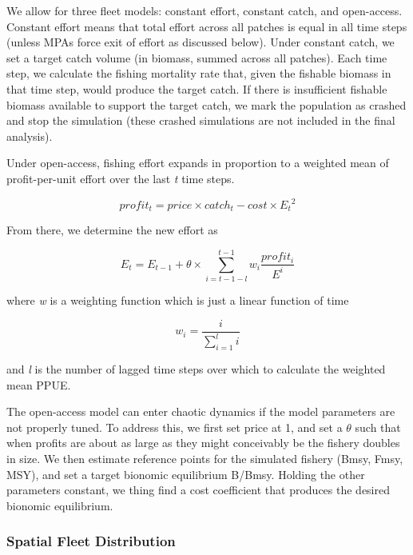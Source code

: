 \documentclass[]{article}
\begin{document}
We allow for three fleet models: constant effort, constant catch, and open-access. Constant effort means that total effort across all patches is equal in all time steps (unless MPAs force exit of effort as discussed below). Under constant catch, we set a target catch volume (in biomass, summed across all patches). Each time step, we calculate the fishing mortality rate that, given the fishable biomass in that time step, would produce the target catch. If there is insufficient fishable biomass available to support the target catch, we mark the population as crashed and stop the simulation (these crashed simulations are not included in the final analysis).

Under open-access, fishing effort expands in proportion to a weighted mean of profit-per-unit effort over the last \emph{t} time steps.

\begin{equation}
profit_{t} = price\times{catch_t} - cost\times{E_t}^2
  \label{eq:profit}
\end{equation}

From there, we determine the new effort as

\begin{equation}
E_t = E_{t-1} + \theta\times\sum_{i=t-1-l}^{t-1}w_i\frac{profit_{i}}{E^i}
  \label{eq:openaccess}
\end{equation}

where \emph{w} is a weighting function which is just a linear function of time

\begin{equation}
  w_i = \frac{i}{\sum_{i=1}^li}
  \label{eq:oaweight}
\end{equation}

and \emph{l} is the number of lagged time steps over which to calculate the weighted mean PPUE.

The open-access model can enter chaotic dynamics if the model parameters are not properly tuned. To address this, we first set price at 1, and set a \(\theta\) such that when profits are about as large as they might conceivably be the fishery doubles in size. We then estimate reference points for the simulated fishery (Bmsy, Fmsy, MSY), and set a target bionomic equilibrium B/Bmsy. Holding the other parameters constant, we thing find a cost coefficient that produces the desired bionomic equilibrium.

\hypertarget{spatial-fleet-distribution}{%
\subsubsection{Spatial Fleet Distribution}\label{spatial-fleet-distribution}}
\end{document}
